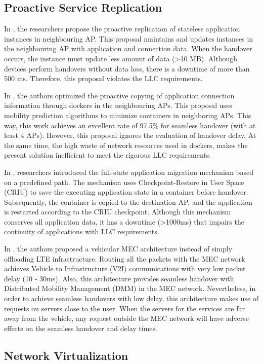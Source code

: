 \subsection{Proactive Service Replication}
In \cite{205}, the researchers propose the proactive replication of stateless application instances in neighbouring AP. This proposal maintains and updates instances in the neighbouring AP with application and connection data. When the handover occurs, the instance must update less amount of data (\textgreater 10 MB). Although devices perform handovers without data loss, there is a downtime of more than 500 ms. Therefore, this proposal violates the LLC requirements.

In \cite{201}, the authors optimized the proactive copying of application connection information through dockers in the neighbouring APs. This proposal uses mobility prediction algorithms to minimize containers in neighboring APs. This way, this work achieves an excellent rate of 97.5\% for seamless handover (with at least 4 APs). However, this proposal ignores the evaluation of handover delay. At the same time, the high waste of network resources used in dockers, makes the present solution inefficient to meet the rigorous LLC requirements.

In \cite{217}, researchers introduced the full-state application migration mechanism based on a predefined path. The mechanism uses Checkpoint-Restore in User Space (CRIU) to save the executing application state in a container before handover. Subsequently, the container is copied to the destination AP, and the application is restarted according to the CRIU checkpoint. Although this mechanism conserves all application data, it has a downtime (\textgreater 1000ms) that impairs the continuity of applications with LLC requirements.

In \cite{903}, the authors proposed a vehicular MEC architecture instead of simply offloading LTE infrastructure. Routing all the packets with the MEC network achieves Vehicle to Infrastructure (V2I) communications with very low packet delay (10 - 30ms). Also, this architecture provides seamless handover with Distributed Mobility Management (DMM) in the MEC network. Nevertheless, in order to achieve seamless handovers with low delay, this architecture makes use of requests on servers close to the user. When the servers for the services are far away from the vehicle, any request outside the MEC network will have adverse effects on the seamless handover and delay times. 

\subsection{Network Virtualization}

